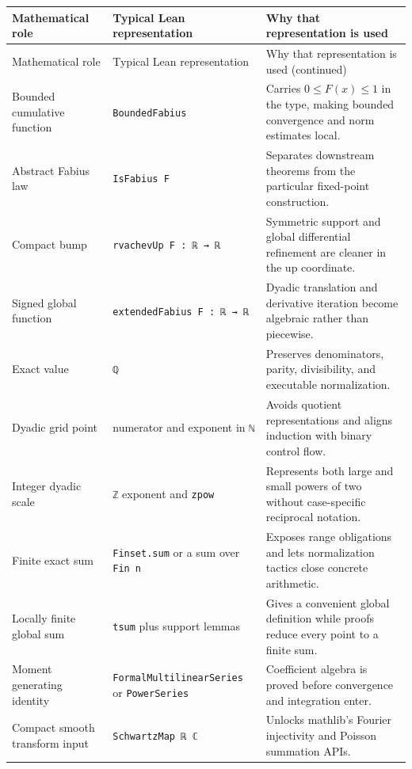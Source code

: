 \documentclass[11pt,a4paper,openany]{book}
\newcommand{\pathbreak}[1]{\nolinkurl{#1}}
\begin{document}
\begin{longtable}{@{}>{\raggedright\arraybackslash}p{}>{\raggedright\arraybackslash}p{}p{}@{}}
\toprule
Mathematical role & Typical Lean representation & Why that representation is used \\
\midrule
\endfirsthead
\toprule
Mathematical role & Typical Lean representation & Why that representation is used (continued) \\
\midrule
\endhead
\bottomrule
\endlastfoot
Bounded cumulative function & \pathbreak{BoundedFabius} & Carries $0\le F(x)\le1$ in the type, making bounded convergence and norm estimates local. \\
\addlinespace[.35em]
Abstract Fabius law & \pathbreak{IsFabius F} & Separates downstream theorems from the particular fixed-point construction. \\
\addlinespace[.35em]
Compact bump & \pathbreak{rvachevUp F : ℝ → ℝ} & Symmetric support and global differential refinement are cleaner in the up coordinate. \\
\addlinespace[.35em]
Signed global function & \pathbreak{extendedFabius F : ℝ → ℝ} & Dyadic translation and derivative iteration become algebraic rather than piecewise. \\
\addlinespace[.35em]
Exact value & \pathbreak{ℚ} & Preserves denominators, parity, divisibility, and executable normalization. \\
\addlinespace[.35em]
Dyadic grid point & numerator and exponent in \pathbreak{ℕ} & Avoids quotient representations and aligns induction with binary control flow. \\
\addlinespace[.35em]
Integer dyadic scale & \pathbreak{ℤ} exponent and \pathbreak{zpow} & Represents both large and small powers of two without case-specific reciprocal notation. \\
\addlinespace[.35em]
Finite exact sum & \pathbreak{Finset.sum} or a sum over \pathbreak{Fin n} & Exposes range obligations and lets normalization tactics close concrete arithmetic. \\
\addlinespace[.35em]
Locally finite global sum & \pathbreak{tsum} plus support lemmas & Gives a convenient global definition while proofs reduce every point to a finite sum. \\
\addlinespace[.35em]
Moment generating identity & \pathbreak{FormalMultilinearSeries} or \pathbreak{PowerSeries} & Coefficient algebra is proved before convergence and integration enter. \\
\addlinespace[.35em]
Compact smooth transform input & \pathbreak{SchwartzMap ℝ ℂ} & Unlocks mathlib's Fourier injectivity and Poisson summation APIs. \\

\end{longtable}
\end{document}
